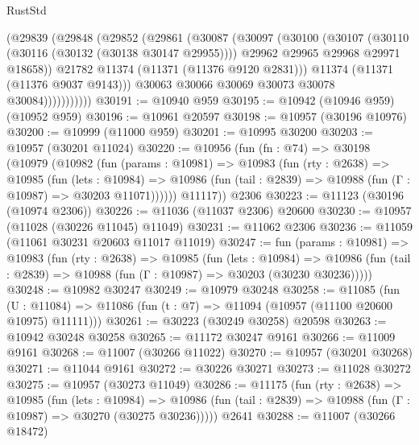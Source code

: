 \begin{lexlean}{RustStd}
\begin{coremodule}
                  (@29839
                    (@29848
                      (@29852
                        (@29861
                          (@30087
                            (@30097
                              (@30100
                                (@30107
                                  (@30110 (@30116 (@30132 (@30138 @30147 @29955))))
                                  @29962
                                  @29965
                                  @29968
                                  @29971
                                  @18658))
                              @21782
                              @11374
                              (@11371 (@11376 @9120 @2831)))
                            @11374
                            (@11371 (@11376 @9037 @9143)))
                          @30063
                          @30066
                          @30069
                          @30073
                          @30078
                          @30084)))))))))))
@30191 := @10940 @959
@30195 := @10942 (@10946 @959) (@10952 @959)
@30196 := @10961 @20597
@30198 := @10957 (@30196 @10976)
@30200 := @10999 (@11000 @959)
@30201 := @10995 @30200
@30203 := @10957 (@30201 @11024)
@30220 := @10956
    (fun (fn : @74) =>
    @30198
      (@10979
        (@10982
          (fun (params : @10981) =>
          @10983
            (fun (rty : @2638) =>
            @10985
              (fun (lets : @10984) =>
              @10986 (fun (tail : @2839) => @10988 (fun (Γ : @10987) => @30203 @11071))))))
        @11117))
    @2306
@30223 := @11123 (@30196 (@10974 @2306))
@30226 := @11036 (@11037 @2306) @20600
@30230 := @10957 (@11028 (@30226 @11045) @11049)
@30231 := @11062 @2306
@30236 := @11059 (@11061 @30231 @20603 @11017 @11019)
@30247 := fun (params : @10981) =>
  @10983
    (fun (rty : @2638) =>
    @10985
      (fun (lets : @10984) =>
      @10986 (fun (tail : @2839) => @10988 (fun (Γ : @10987) => @30203 (@30230 @30236)))))
@30248 := @10982 @30247
@30249 := @10979 @30248
@30258 := @11085
    (fun (U : @11084) => @11086 (fun (t : @7) => @11094 (@10957 (@11100 @20600 @10975) @11111)))
@30261 := @30223 (@30249 @30258) @20598
@30263 := @10942 @30248 @30258
@30265 := @11172 @30247 @9161
@30266 := @11009 @9161
@30268 := @11007 (@30266 @11022)
@30270 := @10957 (@30201 @30268)
@30271 := @11044 @9161
@30272 := @30226 @30271
@30273 := @11028 @30272
@30275 := @10957 (@30273 @11049)
@30286 := @11175
    (fun (rty : @2638) =>
    @10985
      (fun (lets : @10984) =>
      @10986 (fun (tail : @2839) => @10988 (fun (Γ : @10987) => @30270 (@30275 @30236)))))
    @2641
@30288 := @11007 (@30266 @18472)

\end{coremodule}
\end{lexlean}

